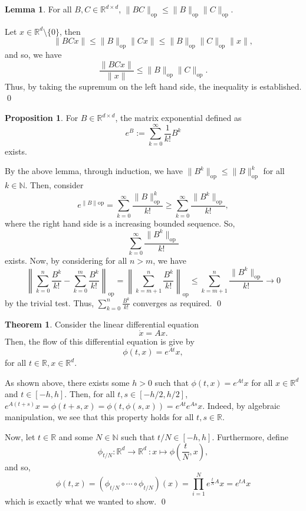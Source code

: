 \documentclass[
]{article}
\theoremstyle{definition}
\newtheorem{theorem}{Theorem}
\newtheorem{prop}{Proposition}
\theoremstyle{definition}
\newtheorem{lemma}{Lemma}[section]
\begin{document}
\begin{lemma}
  For all \(B, C \in \mathbb{R}^{d \times d}\), \(\|BC\|_\text{op} \le 
  \|B\|_\text{op}\|C\|_\text{op}\).
\end{lemma}
\proof

Let \(x \in \mathbb{R}^d\setminus\{0\}\), then
\[\|BC x \| \le \|B\|_\text{op}\|Cx\| \le \|B\|_\text{op}\|C\|_\text{op} \|x\|,\]
and so, we have
\[\frac{\|BCx\|}{\|x\|} \le \|B\|_\text{op}\|C\|_\text{op}.\] Thus, by
taking the supremum on the left hand side, the inequality is
established. \qed

\begin{prop}
  For \(B \in \mathbb{R}^{d \times d}\), the matrix exponential defined as 
  \[e^{B} := \sum_{k = 0}^\infty \frac{1}{k!} B^k\]
  exists.
\end{prop}
\proof

By the above lemma, through induction, we have
\(\|B^k\|_\text{op} \le \|B\|_\text{op}^k\) for all
\(k \in \mathbb{N}\). Then, consider
\[e^{\|B\|\text{op}} = \sum_{k = 0}^\infty \frac{\|B\|_\text{op}^k}{k!} \ge 
    \sum_{k = 0}^\infty \frac{\|B^k\|_\text{op}}{k!},\] where the right
hand side is a increasing bounded sequence. So,
\[\sum_{k = 0}^\infty \frac{\|B^k\|_\text{op}}{k!}\] exists. Now, by
considering for all \(n > m\), we have
\[\left\|\sum_{k = 0}^n \frac{B^k}{k!} - \sum_{k = 0}^m \frac{B^k}{k!}\right\|_\text{op} 
    = \left\|\sum_{k = m + 1}^n \frac{B^k}{k!}\right\|_\text{op}
    \le \sum_{k = m + 1}^n \frac{\|B^k\|_\text{op}}{k!} \to 0\] by the
trivial test. Thus, \(\sum_{k = 0}^n \frac{B^k}{k!}\) converges as
required. \qed

\begin{theorem}
  Consider the linear differential equation 
  \[\dot x = A x.\]
  Then, the flow of this differential equation is give by 
  \[\phi(t, x) = e^{At} x,\]
  for all \(t \in \mathbb{R}, x \in \mathbb{R}^d\).
\end{theorem}
\proof

As shown above, there exists some \(h > 0\) such that
\(\phi(t, x) = e^{At} x\) for all \(x \in \mathbb{R}^d\) and
\(t \in [-h, h]\). Then, for all \(t, s \in [-h/2, h/2]\),
\(e^{A(t + s)}x = \phi(t + s, x) = \phi(t, \phi(s, x))  = e^{At}e^{As}x\).
Indeed, by algebraic manipulation, we see that this property holds for
all \(t, s \in \mathbb{R}\).

Now, let \(t \in \mathbb{R}\) and some \(N \in \mathbb{N}\) such that
\(t / N \in [-h, h]\). Furthermore, define
\[\phi_{t / N} : \mathbb{R}^d \to \mathbb{R}^d\ : x \mapsto \phi\left(\frac{t}{N}, x\right),\]
and so,
\[\phi(t, x) = (\phi_{t / N} \circ \cdots \circ \phi_{t / N})(x) = 
    \prod_{i = 1}^N e^{\frac{t}{N}A} x = e^{tA}x\] which is exactly what
we wanted to show. \qed
\end{document}
